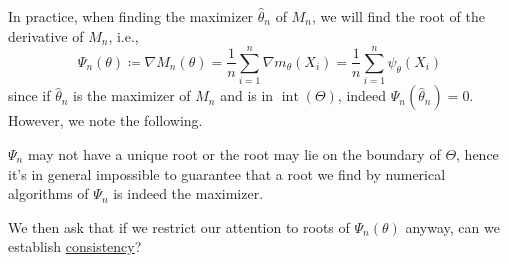 In practice, when finding the maximizer \(\hat{\theta} _n\) of \(M_n\), we will find the root of the derivative of \(M_n\), i.e.,
\[
	\Psi _n(\theta )
	\coloneqq \nabla M_n(\theta )
	= \frac{1}{n}\sum_{i=1}^{n} \nabla m_{\theta }(X_i)
	= \frac{1}{n}\sum_{i=1}^{n} \psi _\theta (X_i)
\]
since if \(\hat{\theta} _n\) is the maximizer of \(M_n\) and is in \(\operatorname{int}(\Theta ) \), indeed \(\Psi _n(\hat{\theta} _n) = 0\). However, we note the following.

\begin{note}
	\(\Psi _n\) may not have a unique root or the root may lie on the boundary of \(\Theta \), hence it's in general impossible to guarantee that a root we find by numerical algorithms of \(\Psi _n\) is indeed the maximizer.
\end{note}

We then ask that if we restrict our attention to roots of \(\Psi _n(\theta )\) anyway, can we establish \hyperref[def:consistent]{consistency}?

